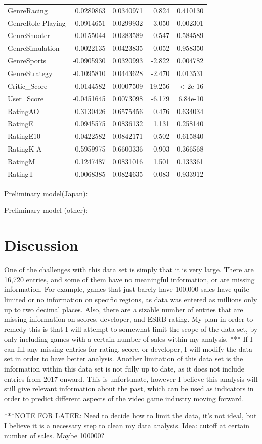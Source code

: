 \documentclass[12pt]{article}
\begin{document}
\begin{table}[ht]
\begin{tabular}{lrrrr}
$$GenreRacing & 0.0280863 & 0.0340971 & 0.824 & 0.410130 \\
GenreRole-Playing & -0.0914651 & 0.0299932 & -3.050 & 0.002301 \\
GenreShooter & 0.0155044 & 0.0283589 & 0.547 & 0.584589 \\
GenreSimulation & -0.0022135 & 0.0423835 & -0.052 & 0.958350 \\
GenreSports & -0.0905930 & 0.0320993 & -2.822 & 0.004782 \\
GenreStrategy & -0.1095810 & 0.0443628 & -2.470 & 0.013531 \\
Critic_Score & 0.0144582 & 0.0007509 & 19.256 & < 2e-16 \\
User_Score & -0.0451645 & 0.0073098 & -6.179 & 6.84e-10 \\
RatingAO & 0.3130426 & 0.6575456 & 0.476 & 0.634034 \\
RatingE & 0.0945575 & 0.0836132 & 1.131 & 0.258140 \\
RatingE10+ & -0.0422582 & 0.0842171 & -0.502 & 0.615840 \\
RatingK-A & -0.5959975 & 0.6600336 & -0.903 & 0.366568 \\
RatingM & 0.1247487 & 0.0831016 & 1.501 & 0.133361 \\
RatingT & 0.0068385 & 0.0824635 & 0.083 & 0.933912 \\
 \hline
\end{tabular}
\end{table}

Preliminary model(Japan):


Preliminary model (other):



\section{Discussion}
\label{sec:disc}

One of the challenges with this data set is simply that it is very large. There are 16,720 entries, and some of them have no meaningful 
information, or are missing information. For example, games that just barely have 100,000 sales have quite limited or no information on 
specific regions, as data was entered as millions only up to two decimal places. Also, there are a sizable number of entries that are 
missing information on scores, developer, and ESRB rating. My plan in order to remedy this is that I will attempt to somewhat limit the 
scope of the data set, by only including games with a certain number of sales within my analysis. ***
If I can fill any missing entries for rating, score, or developer, I will modify the data set in order to have better analysis. Another 
limitation of this data set is the information within this data set is not fully up to date, as it does not include entries from 2017 
onward. This is unfortunate, however I believe this analysis will still give relevant information about the past, which can be used as 
indicators in order to predict different aspects of the video game industry moving forward.

***NOTE FOR LATER: Need to decide how to limit the data, it's not ideal, but I believe it is a necessary step to clean my data analysis. Idea: cutoff at certain number of sales. Maybe 100000?


\end{document}
